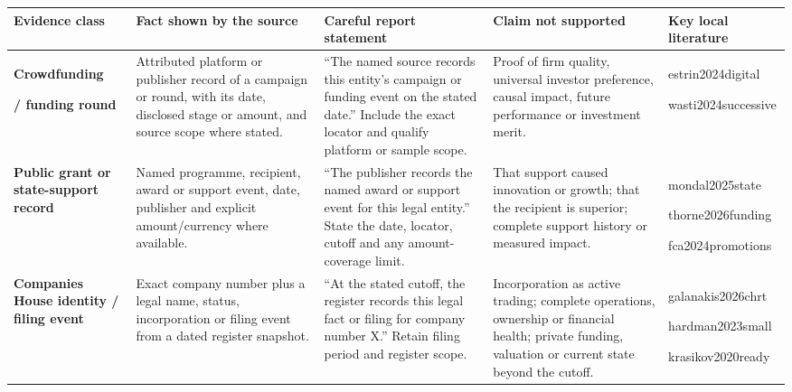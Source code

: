 \clearpage
\begin{table}[p]
  \centering
  \footnotesize
  \setlength{\tabcolsep}{2.2pt}
  \renewcommand{\arraystretch}{1.16}
  \begin{tabularx}{\textwidth}{@{}P{0.152\textwidth}P{0.188\textwidth}P{0.22\textwidth}Y>{\RaggedRight\arraybackslash\scriptsize}p{0.15\textwidth}@{}}
    \toprule
    \textbf{Evidence class} &
    \textbf{Fact shown by the source} &
    \textbf{Careful report statement} &
    \textbf{Claim not supported} &
    {\rmfamily\footnotesize\textbf{Key local literature}} \\
    \midrule
    \textbf{Crowdfunding}\par\textbf{/ funding round} &
    Attributed platform or publisher record of a campaign or round, with its date, disclosed stage or amount, and source scope where stated. &
    ``The named source records this entity's campaign or funding event on the stated date.'' Include the exact locator and qualify platform or sample scope. &
    Proof of firm quality, universal investor preference, causal impact, future performance or investment merit. &
    estrin2024\allowbreak digital\par wasti2024\allowbreak successive \\
    \addlinespace
    \textbf{Public grant or state-support record} &
    Named programme, recipient, award or support event, date, publisher and explicit amount/currency where available. &
    ``The publisher records the named award or support event for this legal entity.'' State the date, locator, cutoff and any amount-coverage limit. &
    That support caused innovation or growth; that the recipient is superior; complete support history or measured impact. &
    mondal2025\allowbreak state\par thorne2026\allowbreak funding\par fca2024\allowbreak promotions \\
    \addlinespace
    \textbf{Companies House identity / filing event} &
    Exact company number plus a legal name, status, incorporation or filing event from a dated register snapshot. &
    ``At the stated cutoff, the register records this legal fact or filing for company number X.'' Retain filing period and register scope. &
    Incorporation as active trading; complete operations, ownership or financial health; private funding, valuation or current state beyond the cutoff. &
    galanakis2026\allowbreak chrt\par hardman2023\allowbreak small\par krasikov2020\allowbreak ready \\

\end{tabularx}
\end{table}
